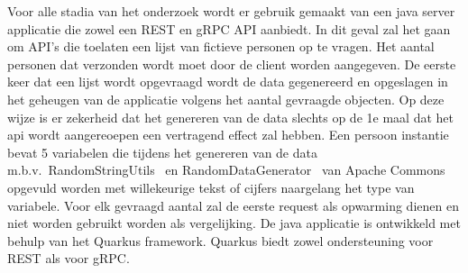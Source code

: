 Voor alle stadia van het onderzoek wordt er gebruik gemaakt van een java server applicatie die zowel een REST en gRPC API aanbiedt.
In dit geval zal het gaan om API's die toelaten een lijst van fictieve personen op te vragen. Het aantal personen dat verzonden wordt moet door de client worden aangegeven.
De eerste keer dat een lijst wordt opgevraagd wordt de data gegenereerd en opgeslagen in het geheugen van de applicatie volgens het aantal gevraagde objecten.
Op deze wijze is er zekerheid dat het genereren van de data slechts op de 1e maal dat het api wordt aangereoepen een vertragend effect zal hebben.
Een persoon instantie bevat 5 variabelen die tijdens het genereren van de data m.b.v.\ RandomStringUtils~\parencite{RandomStringUtils}
en RandomDataGenerator~\parencite{RandomDataGenerator} van Apache Commons opgevuld worden met willekeurige tekst of cijfers naargelang het type van variabele.
Voor elk gevraagd aantal zal de eerste request als opwarming dienen en niet worden gebruikt worden als vergelijking.
De java applicatie is ontwikkeld met behulp van het Quarkus framework.
Quarkus biedt zowel ondersteuning voor REST als voor gRPC.\newline
~\autocite{quarkusAbout}\\

